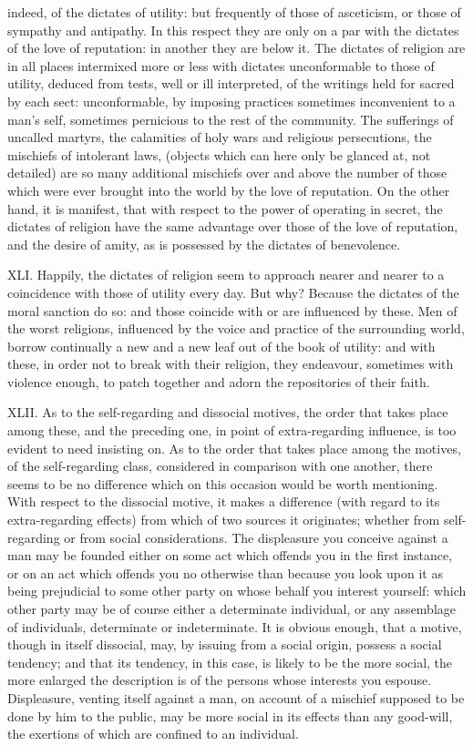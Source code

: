 \documentclass[12pt]{report}
\begin{document}
indeed, of the dictates of utility: but frequently of those of
asceticism, or those of sympathy and antipathy. In this respect they are
only on a par with the dictates of the love of reputation: in another
they are below it. The dictates of religion are in all places intermixed
more or less with dictates unconformable to those of utility, deduced
from tests, well or ill interpreted, of the writings held for sacred by
each sect: unconformable, by imposing practices sometimes inconvenient
to a man's self, sometimes pernicious to the rest of the community. The
sufferings of uncalled martyrs, the calamities of holy wars and
religious persecutions, the mischiefs of intolerant laws, (objects which
can here only be glanced at, not detailed) are so many additional
mischiefs over and above the number of those which were ever brought
into the world by the love of reputation. On the other hand, it is
manifest, that with respect to the power of operating in secret, the
dictates of religion have the same advantage over those of the love of
reputation, and the desire of amity, as is possessed by the dictates of
benevolence.

XLI. Happily, the dictates of religion seem to approach nearer and
nearer to a coincidence with those of utility every day. But why?
Because the dictates of the moral sanction do so: and those coincide
with or are influenced by these. Men of the worst religions, influenced
by the voice and practice of the surrounding world, borrow continually a
new and a new leaf out of the book of utility: and with these, in order
not to break with their religion, they endeavour, sometimes with
violence enough, to patch together and adorn the repositories of their
faith.

XLII. As to the self-regarding and dissocial motives, the order that
takes place among these, and the preceding one, in point of
extra-regarding influence, is too evident to need insisting on. As to
the order that takes place among the motives, of the self-regarding
class, considered in comparison with one another, there seems to be no
difference which on this occasion would be worth mentioning. With
respect to the dissocial motive, it makes a difference (with regard to
its extra-regarding effects) from which of two sources it originates;
whether from self-regarding or from social considerations. The
displeasure you conceive against a man may be founded either on some act
which offends you in the first instance, or on an act which offends you
no otherwise than because you look upon it as being prejudicial to some
other party on whose behalf you interest yourself: which other party may
be of course either a determinate individual, or any assemblage of
individuals, determinate or indeterminate. It is obvious enough, that a
motive, though in itself dissocial, may, by issuing from a social
origin, possess a social tendency; and that its tendency, in this case,
is likely to be the more social, the more enlarged the description is of
the persons whose interests you espouse. Displeasure, venting itself
against a man, on account of a mischief supposed to be done by him to
the public, may be more social in its effects than any good-will, the
exertions of which are confined to an individual.
\end{document}
